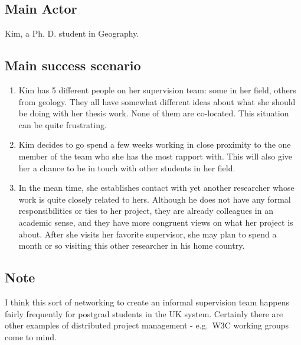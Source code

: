 \subsection{Main Actor}

Kim, a Ph. D. student in Geography.

\subsection{Main success scenario}

\begin{enumerate}
\item
  Kim has 5 different people on her supervision team: some in her field,
  others from geology. They all have somewhat different ideas about what
  she should be doing with her thesis work. None of them are co-located.
  This situation can be quite frustrating.
\item
  Kim decides to go spend a few weeks working in close proximity to the
  one member of the team who she has the most rapport with. This will
  also give her a chance to be in touch with other students in her
  field.
\item
  In the mean time, she establishes contact with yet another researcher
  whose work is quite closely related to hers. Although he does not have
  any formal responsibilities or ties to her project, they are already
  colleagues in an academic sense, and they have more congruent views on
  what her project is about. After she visits her favorite supervisor,
  she may plan to spend a month or so visiting this other researcher in
  his home country.
\end{enumerate}
\subsection{Note}

I think this sort of networking to create an informal supervision team
happens fairly frequently for postgrad students in the UK system.
Certainly there are other examples of distributed project management -
e.g.~W3C working groups come to mind.
